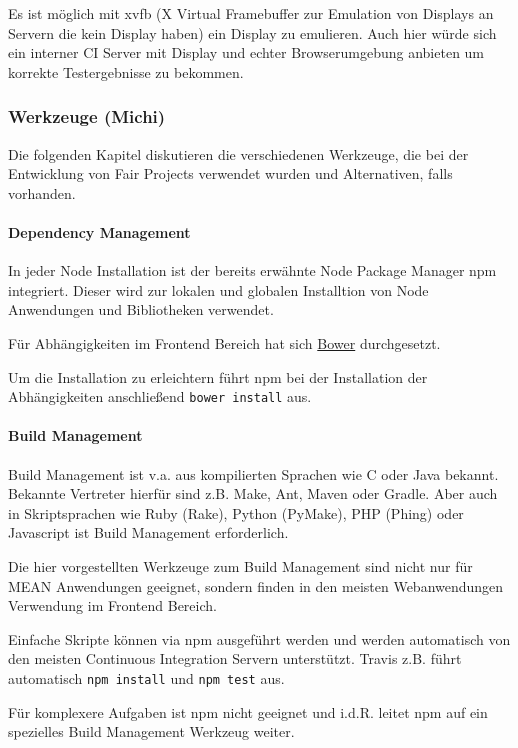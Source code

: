 \documentclass[]{article}
\begin{document}
Es ist möglich mit xvfb (X Virtual Framebuffer zur Emulation von
Displays an Servern die kein Display haben) ein Display zu emulieren.
Auch hier würde sich ein interner CI Server mit Display und echter
Browserumgebung anbieten um korrekte Testergebnisse zu bekommen.

\subsubsection{Werkzeuge (Michi)}\label{werkzeuge-michi}

Die folgenden Kapitel diskutieren die verschiedenen Werkzeuge, die bei
der Entwicklung von Fair Projects verwendet wurden und Alternativen,
falls vorhanden.

\paragraph{Dependency Management}\label{dependency-management}

In jeder Node Installation ist der bereits erwähnte Node Package Manager
npm integriert. Dieser wird zur lokalen und globalen Installtion von
Node Anwendungen und Bibliotheken verwendet.

Für Abhängigkeiten im Frontend Bereich hat sich
\href{http://bower.io/}{Bower} durchgesetzt.

Um die Installation zu erleichtern führt npm bei der Installation der
Abhängigkeiten anschließend \texttt{bower\ install} aus.

\paragraph{Build Management}\label{build-management}

Build Management ist v.a. aus kompilierten Sprachen wie C oder Java
bekannt. Bekannte Vertreter hierfür sind z.B. Make, Ant, Maven oder
Gradle. Aber auch in Skriptsprachen wie Ruby (Rake), Python (PyMake),
PHP (Phing) oder Javascript ist Build Management erforderlich.

Die hier vorgestellten Werkzeuge zum Build Management sind nicht nur für
MEAN Anwendungen geeignet, sondern finden in den meisten Webanwendungen
Verwendung im Frontend Bereich.

Einfache Skripte können via npm ausgeführt werden und werden automatisch
von den meisten Continuous Integration Servern unterstützt. Travis z.B.
führt automatisch \texttt{npm\ install} und \texttt{npm\ test} aus.

Für komplexere Aufgaben ist npm nicht geeignet und i.d.R. leitet npm auf
ein spezielles Build Management Werkzeug weiter.
\end{document}
